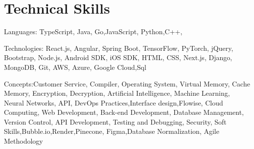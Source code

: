 \section{Technical Skills}
    \begin{itemize}[leftmargin=0.15in, label={}]
	\small{\item{
		Languages: TypeScript, Java, Go,JavaScript, Python,C++,


Technologies: React.js, Angular, Spring Boot, TensorFlow, PyTorch, jQuery, Bootstrap, Node.js, Android SDK, iOS SDK, HTML, CSS, Next.js, Django, MongoDB, Git, AWS, Azure, Google Cloud,Sql

Concepts:Customer Service, Compiler, Operating System, Virtual Memory, Cache Memory, Encryption, Decryption, Artificial Intelligence, Machine Learning, Neural Networks, API, DevOps Practices,Interface design,Flowise, Cloud Computing, Web Development, Back-end Development, Database Management, Version Control, API Development, Testing and Debugging, Security, Soft Skills,Bubble.io,Render,Pinecone, Figma,Database Normalization, Agile Methodology



 

 
	}}
    \end{itemize}